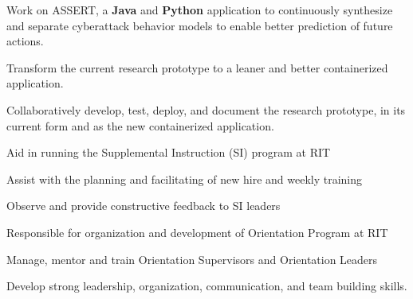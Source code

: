 \documentclass[]{deedy-resume-openfont}
\begin{document}
\begin{minipage}[t]{0.67\textwidth}
\begin{tightemize}
  \item Work on ASSERT, a \textbf{Java} and \textbf{Python} application to continuously synthesize and separate cyberattack behavior models to enable better prediction of future actions.
  \item Transform the current research prototype to a leaner and better containerized application.
  \item Collaboratively develop, test, deploy, and document the research prototype, in its current form and as the new containerized application.
\end{tightemize}
\begin{tightemize}
  \item Aid in running the Supplemental Instruction (SI) program at RIT
  \item Assist with the planning and facilitating of new hire and weekly training
  \item Observe and provide constructive feedback to SI leaders
\end{tightemize}
\begin{tightemize}
  \item Responsible for organization and development of Orientation Program at RIT
  \item Manage, mentor and train Orientation Supervisors and Orientation Leaders
  \item Develop strong leadership, organization, communication, and team building skills.
\end{tightemize}
\sectionsep




\end{minipage}
\end{document}
